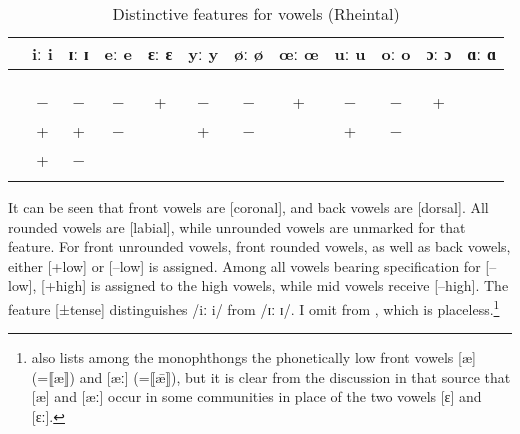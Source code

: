 \begin{table}
\caption{\label{ex:3:13} Distinctive features for vowels (Rheintal)}
\begin{tabular}{l cc cc cc cc cc c}
\lsptoprule
  & iː  i & ɪː  ɪ & eː e & ɛː ɛ & yː y & øː ø & œː œ & uː u & oː o & ɔː ɔ & ɑː ɑ\\\midrule
\relax [coronal] & \langscicheckmark{} & \langscicheckmark{} & \langscicheckmark{} & \langscicheckmark{} & \langscicheckmark{} & \langscicheckmark{} & \langscicheckmark{} &  &  &  & \\
\relax [dorsal] &  &  &  &  &  &  &  & \langscicheckmark{} & \langscicheckmark{} & \langscicheckmark{} & \langscicheckmark{}\\
\relax [labial] &  &  &  &  & \langscicheckmark{} & \langscicheckmark{} & \langscicheckmark{} & \langscicheckmark{} & \langscicheckmark{} & \langscicheckmark{} & \\
\relax [low] & − & − & − & + & − & − & + & − & − & + & \\
\relax [high] & + & + & − &  & + & − &  & + & − &  & \\
\relax [tense] & + & − &  &  &  &  &  &  &  &  & \\
\lspbottomrule
\end{tabular}
\end{table}

It can be seen that front vowels are [coronal], and back vowels are [dorsal]. All rounded vowels are [labial], while unrounded vowels are unmarked for that feature. For front unrounded vowels, front rounded vowels, as well as back vowels, either [+low] or [{}--low] is assigned. Among all vowels bearing specification for [--low], [+high] is assigned to the high vowels, while mid vowels receive [--high]. The feature [±tense] distinguishes /iː i/ from /ɪː ɪ/. I omit  from , which is placeless.\footnote{{\citet[7]{Berger1913} also lists among the monophthongs the phonetically low front vowels [æ] (=⟦æ⟧) and [æː] (=⟦\={æ}⟧), but it is clear from the discussion in that source that [æ] and [æː] occur in some communities in place of the two vowels [ɛ] and [ɛː].}}

